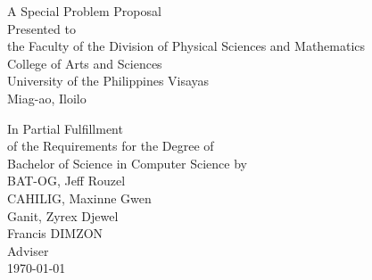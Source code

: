 \begin{titlepage}
\centering


\vspace{1.75cm}
A Special Problem Proposal\\
Presented to\\
the Faculty of the Division of Physical Sciences and Mathematics\\
College of Arts and Sciences\\
University of the Philippines Visayas\\
Miag-ao, Iloilo

\vspace{1.75cm}
In Partial Fulfillment\\
of the Requirements for the Degree of\\
Bachelor of Science in Computer Science
\vspace{1.75cm}
by\\

\vspace{1cm}
BAT-OG, Jeff Rouzel  \\
CAHILIG, Maxinne Gwen  \\
Ganit, Zyrex Djewel  \\

\vspace{1.75cm}
Francis DIMZON \\
Adviser\\

\vspace{1.75cm}
\today
\end{titlepage}
